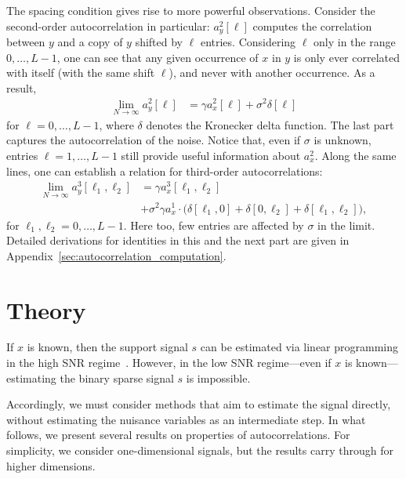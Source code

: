 \documentclass[9pt,twocolumn,twoside,lineno]{pnas-new}
\begin{document}
The spacing condition gives rise to more powerful observations. Consider the second-order autocorrelation in particular: $a_y^2[\ell]$ computes the correlation between $y$ and a copy of $y$ shifted by $\ell$ entries. Considering $\ell$ only in the range $0, \ldots, L-1$, one can see that any given occurrence of $x$ in $y$ is only ever correlated with itself (with the same shift $\ell$), and never with another occurrence. As a result,
\begin{align} \label{eq:ac2_micrograph}
\lim_{N\to\infty} a_y^2[\ell] & = \gamma a_{x}^2[\ell] + \sigma^2\delta[\ell]
\end{align}
for $\ell = 0, \ldots, L-1$, where $\delta$ denotes the Kronecker delta function. The last part captures the autocorrelation of the noise. Notice that, even if $\sigma$ is unknown, entries $\ell = 1, \ldots, L-1$ still provide useful information about $a_x^2$.
Along the same lines, one can establish a relation for third-order autocorrelations:
\begin{align} \label{eq:ac3_micrograph}
\lim_{N\to\infty} a_y^3[\ell_1,\ell_2] & = \gamma a_{x}^3[\ell_1,\ell_2] \\& + \sigma^2\gamma a_{x}^1 \cdot \big(\delta[\ell_1,0]+\delta[0,\ell_2]+\delta[\ell_1,\ell_2]\big), 
 \nonumber
\end{align}
for $\ell_1,\ell_2 = 0, \ldots, L-1$. Here too, few entries are affected by $\sigma$ in the limit.
Detailed derivations for identities in this and the next part are given in Appendix~\ref{sec:autocorrelation_computation}.



\section{Theory} \label{sec:theory}

If $x$ is known, then the support signal $s$ can be estimated via linear programming  in the high SNR regime~\cite{azais2015spike,denoyelle2017support,bendory2016robust,bendory2017robust}. However, in the low SNR regime---even if $x$ is known---estimating the binary sparse signal $s$ is impossible. 


Accordingly, we must consider methods that aim to estimate the signal directly, without estimating the nuisance variables as an intermediate step. 
  In what follows, we present several results on properties of autocorrelations. For simplicity, we consider one-dimensional signals, but the results carry through for higher dimensions. 
\end{document}

